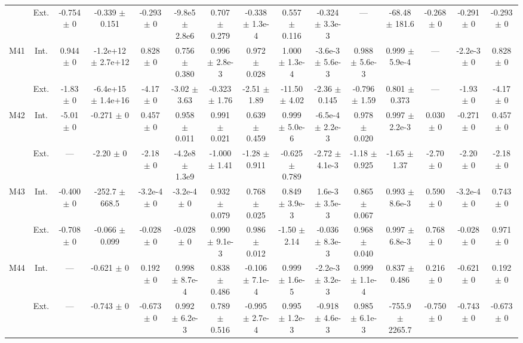 \begin{table}[htbp]
{\begin{tabular}{@{}ccccccccccccccc@{}}
 & Ext. & -0.754 $\pm$ 0 & -0.339 $\pm$ 0.151 & -0.293 $\pm$ 0 & -9.8e5 $\pm$ 2.8e6 & 0.707 $\pm$ 0.279 & -0.338 $\pm$ 1.3e-4 & 0.557 $\pm$ 0.116 & -0.324 $\pm$ 3.3e-3 & --- & -68.48 $\pm$ 181.6 & -0.268 $\pm$ 0 & -0.291 $\pm$ 0 & -0.293 $\pm$ 0 \\
\cline{2-15}
\multirow{2}{*}{M41} & Int. & 0.944 $\pm$ 0 & -1.2e+12 $\pm$ 2.7e+12 & 0.828 $\pm$ 0 & 0.756 $\pm$ 0.380 & 0.996 $\pm$ 2.8e-3 & 0.972 $\pm$ 0.028 & 1.000 $\pm$ 1.3e-4 & -3.6e-3 $\pm$ 5.6e-3 & 0.988 $\pm$ 5.6e-3 & 0.999 $\pm$ 5.9e-4 & --- & -2.2e-3 $\pm$ 0 & 0.828 $\pm$ 0 \\
 & Ext. & -1.83 $\pm$ 0 & -6.4e+15 $\pm$ 1.4e+16 & -4.17 $\pm$ 0 & -3.02 $\pm$ 3.63 & -0.323 $\pm$ 1.76 & -2.51 $\pm$ 1.89 & -11.50 $\pm$ 4.02 & -2.36 $\pm$ 0.145 & -0.796 $\pm$ 1.59 & 0.801 $\pm$ 0.373 & --- & -1.93 $\pm$ 0 & -4.17 $\pm$ 0 \\
\cline{2-15}
\multirow{2}{*}{M42} & Int. & -5.01 $\pm$ 0 & -0.271 $\pm$ 0 & 0.457 $\pm$ 0 & 0.958 $\pm$ 0.011 & 0.991 $\pm$ 0.021 & 0.639 $\pm$ 0.459 & 0.999 $\pm$ 5.0e-6 & -6.5e-4 $\pm$ 2.2e-3 & 0.978 $\pm$ 0.020 & 0.997 $\pm$ 2.2e-3 & 0.030 $\pm$ 0 & -0.271 $\pm$ 0 & 0.457 $\pm$ 0 \\
 & Ext. & --- & -2.20 $\pm$ 0 & -2.18 $\pm$ 0 & -4.2e8 $\pm$ 1.3e9 & -1.000 $\pm$ 1.41 & -1.28 $\pm$ 0.911 & -0.625 $\pm$ 0.789 & -2.72 $\pm$ 4.1e-3 & -1.18 $\pm$ 0.925 & -1.65 $\pm$ 1.37 & -2.70 $\pm$ 0 & -2.20 $\pm$ 0 & -2.18 $\pm$ 0 \\
\cline{2-15}
\multirow{2}{*}{M43} & Int. & -0.400 $\pm$ 0 & -252.7 $\pm$ 668.5 & -3.2e-4 $\pm$ 0 & -3.2e-4 $\pm$ 0 & 0.932 $\pm$ 0.079 & 0.768 $\pm$ 0.025 & 0.849 $\pm$ 3.9e-3 & 1.6e-3 $\pm$ 3.5e-3 & 0.865 $\pm$ 0.067 & 0.993 $\pm$ 8.6e-3 & 0.590 $\pm$ 0 & -3.2e-4 $\pm$ 0 & 0.743 $\pm$ 0 \\
 & Ext. & -0.708 $\pm$ 0 & -0.066 $\pm$ 0.099 & -0.028 $\pm$ 0 & -0.028 $\pm$ 0 & 0.990 $\pm$ 9.1e-3 & 0.986 $\pm$ 0.012 & -1.50 $\pm$ 2.14 & -0.036 $\pm$ 8.3e-3 & 0.968 $\pm$ 0.040 & 0.997 $\pm$ 6.8e-3 & 0.768 $\pm$ 0 & -0.028 $\pm$ 0 & 0.971 $\pm$ 0 \\
\cline{2-15}
\multirow{2}{*}{M44} & Int. & --- & -0.621 $\pm$ 0 & 0.192 $\pm$ 0 & 0.998 $\pm$ 8.7e-4 & 0.838 $\pm$ 0.486 & -0.106 $\pm$ 7.1e-4 & 0.999 $\pm$ 1.6e-5 & -2.2e-3 $\pm$ 3.2e-3 & 0.999 $\pm$ 1.1e-4 & 0.837 $\pm$ 0.486 & 0.216 $\pm$ 0 & -0.621 $\pm$ 0 & 0.192 $\pm$ 0 \\
 & Ext. & --- & -0.743 $\pm$ 0 & -0.673 $\pm$ 0 & 0.992 $\pm$ 6.2e-3 & 0.789 $\pm$ 0.516 & -0.995 $\pm$ 2.7e-4 & 0.995 $\pm$ 1.2e-3 & -0.918 $\pm$ 4.6e-3 & 0.985 $\pm$ 6.1e-3 & -755.9 $\pm$ 2265.7 & -0.750 $\pm$ 0 & -0.743 $\pm$ 0 & -0.673 $\pm$ 0 \\

\end{tabular}}
\end{table}
